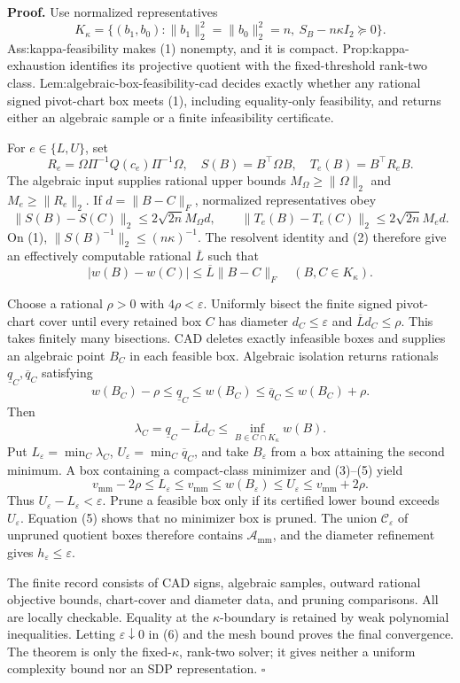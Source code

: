 \textbf{Proof.}
Use normalized representatives
\[
K_\kappa=\{(b_1,b_0):\lVert b_1\rVert_2^2=\lVert b_0\rVert_2^2=n,
\ S_B-n\kappa I_2\succeq0\}.
\tag{1}
\]
Ass:kappa-feasibility makes (1) nonempty, and it is compact.  Prop:kappa-exhaustion identifies its projective quotient with the fixed-threshold rank-two class.  Lem:algebraic-box-feasibility-cad decides exactly whether any rational signed pivot-chart box meets (1), including equality-only feasibility, and returns either an algebraic sample or a finite infeasibility certificate.

For \(e\in\{L,U\}\), set
\[
R_e=\Omega\Pi^{-1}Q(c_e)\Pi^{-1}\Omega,
\quad S(B)=B^\top\Omega B,
\quad T_e(B)=B^\top R_eB.
\]
The algebraic input supplies rational upper bounds \(M_\Omega\ge\lVert\Omega\rVert_2\) and \(M_e\ge\lVert R_e\rVert_2\).  If \(d=\lVert B-C\rVert_F\), normalized representatives obey
\[
\lVert S(B)-S(C)\rVert_2\le2\sqrt{2n}M_\Omega d,
\qquad
\lVert T_e(B)-T_e(C)\rVert_2\le2\sqrt{2n}M_ed.
\tag{2}
\]
On (1), \(\lVert S(B)^{-1}\rVert_2\le(n\kappa)^{-1}\).  The resolvent identity and (2) therefore give an effectively computable rational \(\overline L\) such that
\[
|w(B)-w(C)|\le\overline L\lVert B-C\rVert_F
\quad(B,C\in K_\kappa).
\tag{3}
\]

Choose a rational \(\rho>0\) with \(4\rho<\varepsilon\).  Uniformly bisect the finite signed pivot-chart cover until every retained box \(C\) has diameter \(d_C\le\varepsilon\) and \(\overline Ld_C\le\rho\).  This takes finitely many bisections.  CAD deletes exactly infeasible boxes and supplies an algebraic point \(B_C\) in each feasible box.  Algebraic isolation returns rationals \(\underline q_C,\overline q_C\) satisfying
\[
w(B_C)-\rho\le\underline q_C\le w(B_C)
\le\overline q_C\le w(B_C)+\rho.
\tag{4}
\]
Then
\[
\lambda_C=\underline q_C-\overline Ld_C
\le\inf_{B\in C\cap K_\kappa}w(B).
\tag{5}
\]
Put \(L_\varepsilon=\min_C\lambda_C\), \(U_\varepsilon=\min_C\overline q_C\), and take \(B_\varepsilon\) from a box attaining the second minimum.  A box containing a compact-class minimizer and (3)--(5) yield
\[
v_{\mathrm{mm}}-2\rho\le L_\varepsilon\le v_{\mathrm{mm}}
\le w(B_\varepsilon)\le U_\varepsilon\le v_{\mathrm{mm}}+2\rho.
\tag{6}
\]
Thus \(U_\varepsilon-L_\varepsilon<\varepsilon\).  Prune a feasible box only if its certified lower bound exceeds \(U_\varepsilon\).  Equation (5) shows that no minimizer box is pruned.  The union \(\mathcal C_\varepsilon\) of unpruned quotient boxes therefore contains \(\mathcal A_{\mathrm{mm}}\), and the diameter refinement gives \(h_\varepsilon\le\varepsilon\).

The finite record consists of CAD signs, algebraic samples, outward rational objective bounds, chart-cover and diameter data, and pruning comparisons.  All are locally checkable.  Equality at the \(\kappa\)-boundary is retained by weak polynomial inequalities.  Letting \(\varepsilon\downarrow0\) in (6) and the mesh bound proves the final convergence.  The theorem is only the fixed-\(\kappa\), rank-two solver; it gives neither a uniform complexity bound nor an SDP representation. \(\square\)